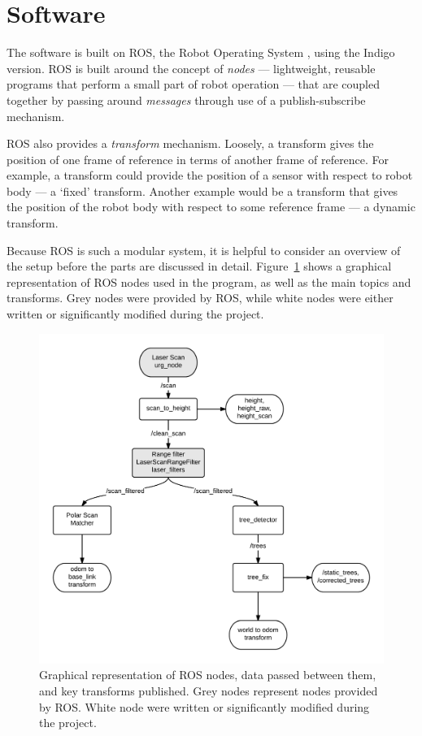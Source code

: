 \documentclass[12pt,oneside,a4paper]{book}
\begin{document}
\section{Software}
\label{sec:software}

The software is built on ROS, the Robot Operating System
\cite{rosos}, using the Indigo version. ROS is built around the
concept of \emph{nodes} --- lightweight, reusable programs that perform a small
part of robot operation --- that are coupled together by passing
around \emph{messages} through use of a publish-subscribe mechanism.

ROS also provides a \emph{transform} mechanism. Loosely, a transform
gives the position of one frame of reference in terms of another frame
of reference. For example, a transform could provide the position of a
sensor with respect to robot body --- a `fixed' transform. Another
example would be a transform that gives the position of the robot body with
respect to some reference frame --- a dynamic transform.

Because ROS is such a modular system, it is helpful to consider an
overview of the setup before the parts are discussed in
detail. Figure~\ref{fig:roschain} shows a graphical representation of
ROS nodes used in the program, as well as the main topics and
transforms. Grey nodes were provided by ROS, while white nodes were
either written or significantly modified during the project.

\begin{figure}[h!]
  \centering
  \includegraphics[width=\textwidth]{figs/roschain}
  \caption{Graphical representation of ROS nodes, data passed between
    them, and key transforms published. Grey nodes represent nodes
    provided by ROS. White node were written or significantly modified
  during the project.}
  \label{fig:roschain}
\end{figure}
\end{document}

